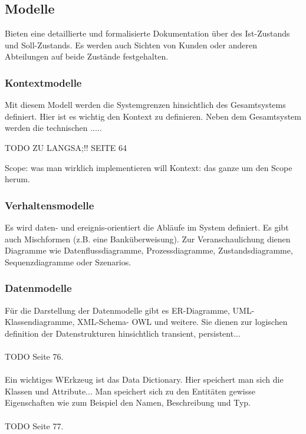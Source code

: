 \subsection{Modelle}
Bieten eine detaillierte und formalisierte Dokumentation über des Ist-Zustands und Soll-Zustands. Es werden auch Sichten von Kunden oder anderen Abteilungen auf beide Zustände festgehalten. 
\subsubsection{Kontextmodelle}
Mit diesem Modell werden die Systemgrenzen hinsichtlich des Gesamtsystems definiert. Hier ist es wichtig den Kontext zu definieren. Neben dem Gesamtsystem werden die technischen .....

TODO ZU LANGSA;!! SEITE 64

Scope: was man wirklich implementieren will
Kontext: das ganze um den Scope herum.
\subsubsection{Verhaltensmodelle}
Es wird daten- und ereignis-orientiert die Abläufe im System definiert. Es gibt auch Mischformen (z.B. eine Banküberweisung). Zur Veranschaulichung dienen Diagramme wie Datenflussdiagramme, Prozessdiagramme, Zustandsdiagramme, Sequenzdiagramme oder Szenarios. 

\subsubsection{Datenmodelle}
Für die Darstellung der Datenmodelle gibt es ER-Diagramme, UML-Klassendiagramme, XML-Schema- OWL und weitere. Sie dienen zur logischen definition der Datenstrukturen hinsichtlich transient, persistent...
\\\\
TODO Seite 76.
\\\\
Ein wichtiges WErkzeug ist das Data Dictionary. Hier speichert man sich die Klassen und Attribute...
Man speichert sich zu den Entitäten gewisse Eigenschaften wie zum Beispiel den Namen, Beschreibung und Typ.
\\\\
TODO Seite 77.
\\\\

